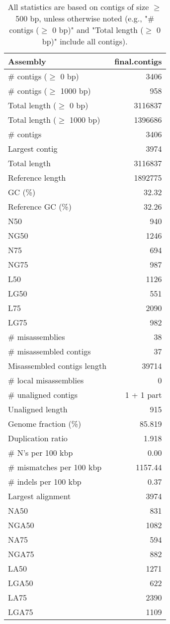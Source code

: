 \documentclass[12pt,a4paper]{article}
\begin{document}
\begin{table}[ht]
\begin{center}
\caption{All statistics are based on contigs of size $\geq$ 500 bp, unless otherwise noted (e.g., "\# contigs ($\geq$ 0 bp)" and "Total length ($\geq$ 0 bp)" include all contigs).}
\begin{tabular}{|l*{1}{|r}|}
\hline
Assembly & final.contigs \\ \hline
\# contigs ($\geq$ 0 bp) & 3406 \\ \hline
\# contigs ($\geq$ 1000 bp) & 958 \\ \hline
Total length ($\geq$ 0 bp) & 3116837 \\ \hline
Total length ($\geq$ 1000 bp) & 1396686 \\ \hline
\# contigs & 3406 \\ \hline
Largest contig & 3974 \\ \hline
Total length & 3116837 \\ \hline
Reference length & 1892775 \\ \hline
GC (\%) & 32.32 \\ \hline
Reference GC (\%) & 32.26 \\ \hline
N50 & 940 \\ \hline
NG50 & 1246 \\ \hline
N75 & 694 \\ \hline
NG75 & 987 \\ \hline
L50 & 1126 \\ \hline
LG50 & 551 \\ \hline
L75 & 2090 \\ \hline
LG75 & 982 \\ \hline
\# misassemblies & 38 \\ \hline
\# misassembled contigs & 37 \\ \hline
Misassembled contigs length & 39714 \\ \hline
\# local misassemblies & 0 \\ \hline
\# unaligned contigs & 1 + 1 part \\ \hline
Unaligned length & 915 \\ \hline
Genome fraction (\%) & 85.819 \\ \hline
Duplication ratio & 1.918 \\ \hline
\# N's per 100 kbp & 0.00 \\ \hline
\# mismatches per 100 kbp & 1157.44 \\ \hline
\# indels per 100 kbp & 0.37 \\ \hline
Largest alignment & 3974 \\ \hline
NA50 & 831 \\ \hline
NGA50 & 1082 \\ \hline
NA75 & 594 \\ \hline
NGA75 & 882 \\ \hline
LA50 & 1271 \\ \hline
LGA50 & 622 \\ \hline
LA75 & 2390 \\ \hline
LGA75 & 1109 \\ \hline
\end{tabular}
\end{center}
\end{table}
\end{document}
